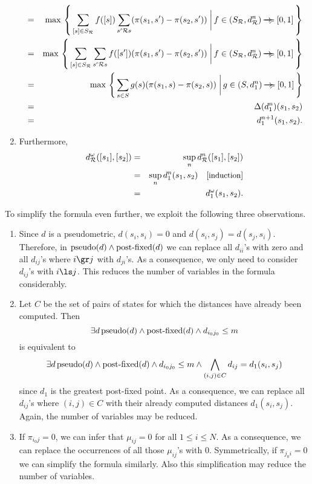 \documentclass{LMCS}
\newcommand{\ndi}{\mathbin{\raisebox{0.15ex}{-\hspace{-0.2em}-\hspace{-0.2em}-\hspace{-0.2em}-\hspace{-0.2em}-\hspace{-0.2em}-}\hspace{-0.7em}\succcurlyeq}}
\newcommand{\comment}[1]{\hspace{1em}\mbox{[{\small #1}]}}
\newcommand{\bigmid}{\; \bigg| \,}
\begin{document}
\begin{enumerate}[$\bullet$]
\begin{eqnarray*}
& = & \max\, \left \{\, \sum_{[s] \in S_{\mathcal{R}}} f([s]) \sum_{s' \mathbin{\mathcal{R}} s} (\pi(s_1, s') - \pi(s_2, s')) \bigmid f \in (S_{\mathcal{R}}, d_{\mathcal{R}}^n) \ndi [0, 1] \, \right \}\\
& = & \max\, \left \{\, \sum_{[s] \in S_{\mathcal{R}}} \sum_{s' \mathbin{\mathcal{R}} s} f([s']) (\pi(s_1, s') - \pi(s_2, s')) \bigmid f \in (S_{\mathcal{R}}, d_{\mathcal{R}}^n) \ndi [0, 1] \, \right \}\\
& = & \max\, \left \{\, \sum_{s \in S} g(s) (\pi(s_1, s) - \pi(s_2, s)) \bigmid g \in (S, d_1^n) \ndi [0, 1] \, \right \}\\
& = & \Delta(d_1^n)(s_1, s_2)\\
& = & d_1^{n+1}(s_1, s_2).
\end{eqnarray*}
\item
Furthermore,
\begin{eqnarray*}
d_{\mathcal{R}}^{\omega}([s_1], [s_2])
& = & \sup_n d_{\mathcal{R}}^n([s_1], [s_2])\\
& = & \sup_n d_1^n(s_1, s_2)
\comment{induction}\\
& = & d_1^{\omega}(s_1, s_2).\rlap{\hbox to186 pt{\hfill\qEd}}\end{eqnarray*}
\end{enumerate}

To simplify the formula even further, we exploit the following three observations.
\begin{enumerate}[$\bullet$]
\item
Since $d$ is a pseudometric, $d(s_i, s_i) = 0$ and 
$d(s_i, s_j) = d(s_j, s_i)$.  Therefore,
in $\mbox{\rm pseudo}(d) \wedge \mbox{\rm post-fixed}(d)$ we can replace
all $d_{ii}$'s with zero and all $d_{ij}$'s where $i \gr j$ with
$d_{ji}$'s.  As a consequence, we only need to consider $d_{ij}$'s with $i \ls j$.
This reduces the number of variables in the formula considerably.
\item
Let $C$ be the set of pairs of states for which the distances have already
been computed.  Then 
\begin{displaymath}
\exists d\, \mbox{\rm pseudo}(d) \wedge \mbox{\rm post-fixed}(d) \wedge d_{i_0 j_0} \leq m
\end{displaymath}
is equivalent to
\begin{displaymath}
\exists d\, \mbox{\rm pseudo}(d) \wedge \mbox{\rm post-fixed}(d) \wedge d_{i_0 j_0} \leq m \wedge \bigwedge_{(i, j) \in C} d_{ij} = d_1(s_i, s_j)
\end{displaymath}
since $d_1$ is the greatest post-fixed point.  As a consequence, we can
replace all $d_{ij}$'s where $(i, j) \in C$ with their already computed
distances $d_1(s_i, s_j)$.  Again, the number of variables may be reduced.
\item
If $\pi_{i_0 j} = 0$, we can infer that $\mu_{ij} = 0$ for all $1 \leq i \leq N$. 
As a consequence, we can replace the occurrences of all those $\mu_{ij}$'s 
with 0.  Symmetrically, if $\pi_{j_0 i} = 0$ we can simplify the formula
similarly.  Also this simplification may reduce the number of variables.
\end{enumerate}
\end{document}
